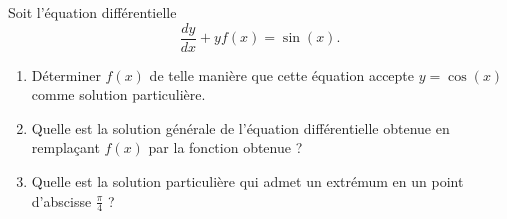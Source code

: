 \begin{exercice}\label{exoEquaDiff0004}

Soit l'équation différentielle
\begin{equation}
	\frac{ dy }{ dx }+yf(x)=\sin(x).
\end{equation}
\begin{enumerate}

\item
Déterminer $f(x)$ de telle manière que cette équation accepte $y=\cos(x)$ comme solution particulière.
\item
Quelle est la solution générale de l'équation différentielle obtenue en remplaçant $f(x)$ par la fonction obtenue ?
\item
Quelle est la solution particulière qui admet un extrémum en un point d'abscisse $\frac{ \pi }{ 4 }$ ?

\end{enumerate}

\end{exercice}
